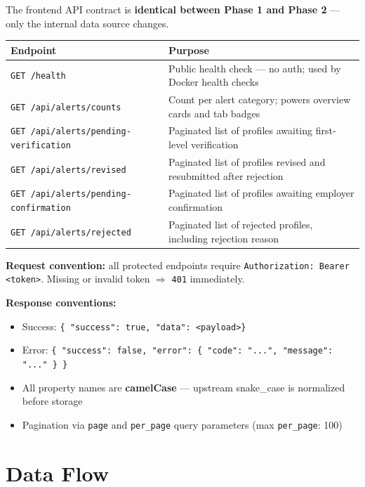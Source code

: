 \documentclass[11pt]{article}
\begin{document}
The frontend API contract is \textbf{identical between Phase 1 and Phase 2} --- only
the internal data source changes.

\begin{table}[h]
\small
\begin{tabularx}{\textwidth}{l X}
\toprule
\textbf{Endpoint} & \textbf{Purpose} \\
\midrule
\texttt{GET /health} & Public health check --- no auth; used by Docker health checks \\
\texttt{GET /api/alerts/counts} & Count per alert category; powers overview cards and tab badges \\
\texttt{GET /api/alerts/pending-verification} & Paginated list of profiles awaiting first-level verification \\
\texttt{GET /api/alerts/revised} & Paginated list of profiles revised and resubmitted after rejection \\
\texttt{GET /api/alerts/pending-confirmation} & Paginated list of profiles awaiting employer confirmation \\
\texttt{GET /api/alerts/rejected} & Paginated list of rejected profiles, including rejection reason \\
\bottomrule
\end{tabularx}
\end{table}

\textbf{Request convention:} all protected endpoints require \texttt{Authorization: Bearer \textless token\textgreater}.
Missing or invalid token $\Rightarrow$ \texttt{401} immediately.

\textbf{Response conventions:}
\begin{itemize}
  \item Success: \texttt{\{ "success": true, "data": \textless payload\textgreater \}}
  \item Error: \texttt{\{ "success": false, "error": \{ "code": "...", "message": "..." \} \}}
  \item All property names are \textbf{camelCase} --- upstream snake\_case is normalized before storage
  \item Pagination via \texttt{page} and \texttt{per\_page} query parameters (max \texttt{per\_page}: 100)
\end{itemize}

\section{Data Flow}
\end{document}
